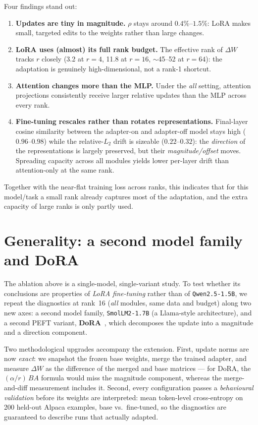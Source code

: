\documentclass[11pt,a4paper]{article}
\begin{document}
Four findings stand out:
\begin{enumerate}
  \item \textbf{Updates are tiny in magnitude.} $\rho$ stays around
        $0.4\%$--$1.5\%$: LoRA makes small, targeted edits to the weights rather
        than large changes.
  \item \textbf{LoRA uses (almost) its full rank budget.} The effective rank of
        $\Delta W$ tracks $r$ closely (3.2 at $r{=}4$, 11.8 at $r{=}16$, $\sim$45--52
        at $r{=}64$): the adaptation is genuinely high-dimensional, not a rank-1
        shortcut.
  \item \textbf{Attention changes more than the MLP.} Under the \textit{all}
        setting, attention projections consistently receive larger relative
        updates than the MLP across every rank.
  \item \textbf{Fine-tuning rescales rather than rotates representations.}
        Final-layer cosine similarity between the adapter-on and adapter-off model
        stays high ($0.96$--$0.98$) while the relative-$L_2$ drift is sizeable
        ($0.22$--$0.32$): the \emph{direction} of the representations is largely
        preserved, but their \emph{magnitude/offset} moves. Spreading capacity
        across all modules yields lower per-layer drift than attention-only at the
        same rank.
\end{enumerate}
Together with the near-flat training loss across ranks, this indicates that for
this model/task a small rank already captures most of the adaptation, and the
extra capacity of large ranks is only partly used.

\section{Generality: a second model family and DoRA}
\label{sec:generality}

The ablation above is a single-model, single-variant study. To test whether its
conclusions are properties of \emph{LoRA fine-tuning} rather than of
\texttt{Qwen2.5-1.5B}, we repeat the diagnostics at rank~16 (\textit{all}
modules, same data and budget) along two new axes: a second model family,
\texttt{SmolLM2-1.7B} (a Llama-style architecture), and a second PEFT variant,
\textbf{DoRA}~\cite{dora}, which decomposes the update into a magnitude and a
direction component.

Two methodological upgrades accompany the extension. First, update norms are
now \emph{exact}: we snapshot the frozen base weights, merge the trained
adapter, and measure $\Delta W$ as the difference of the merged and base
matrices --- for DoRA, the $(\alpha/r)\,BA$ formula would miss the magnitude
component, whereas the merge-and-diff measurement includes it. Second, every
configuration passes a \emph{behavioural validation} before its weights are
interpreted: mean token-level cross-entropy on 200 held-out Alpaca examples,
base vs.\ fine-tuned, so the diagnostics are guaranteed to describe runs that
actually adapted.
\end{document}
